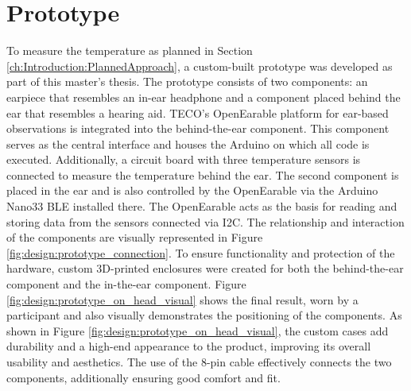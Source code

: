 \section{Prototype}
\label{ch:Design:Prototype}
To measure the temperature as planned in Section \ref{ch:Introduction:PlannedApproach}, a custom-built prototype was developed as part of this master's thesis.
The prototype consists of two components: an earpiece that resembles an in-ear headphone and a component placed behind the ear that resembles a hearing aid. TECO's OpenEarable platform for ear-based observations is integrated into the behind-the-ear component. This component serves as the central interface and houses the Arduino on which all code is executed. Additionally, a circuit board with three temperature sensors is connected to measure the temperature behind the ear.
The second component is placed in the ear and is also controlled by the OpenEarable via the Arduino Nano33 BLE installed there. The OpenEarable acts as the basis for reading and storing data from the sensors connected via I2C. The relationship and interaction of the components are visually represented in Figure \ref{fig:design:prototype_connection}.
To ensure functionality and protection of the hardware, custom 3D-printed enclosures were created for both the behind-the-ear component and the in-the-ear component. 
Figure \ref{fig:design:prototype_on_head_visual} shows the final result, worn by a participant and also visually demonstrates the positioning of the components.
As shown in Figure \ref{fig:design:prototype_on_head_visual}, the custom cases add durability and a high-end appearance to the product, improving its overall usability and aesthetics.
The use of the 8-pin cable effectively connects the two components, additionally ensuring good comfort and fit.

